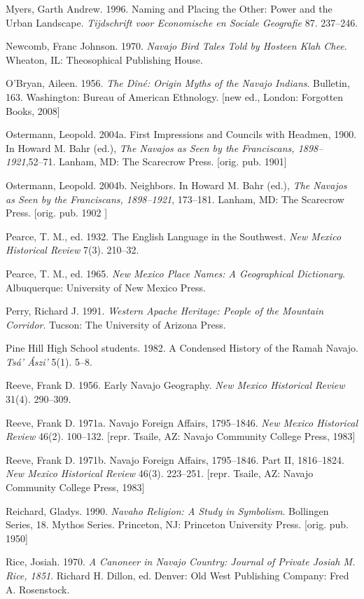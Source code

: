 Myers, Garth Andrew. 1996.  Naming and Placing the Other: Power and the Urban Landscape.  \textit{Tijdschrift voor Economische en Sociale Geografie} 87. 237--246.

Newcomb, Franc Johnson. 1970. \textit{Navajo Bird Tales Told by Hosteen Klah Chee}.  Wheaton, IL:  Theosophical Publishing House.

O'Bryan, Aileen. 1956. \textit{The Dîné: Origin Myths of the Navajo Indians}.  Bulletin,  163.  Washington:  Bureau of American Ethnology.  [new ed., London:  Forgotten Books, 2008]

Ostermann, Leopold. 2004a.  First Impressions and Councils with Headmen, 1900.  In Howard M. Bahr (ed.), \textit{The Navajos as Seen by the Franciscans, 1898--1921},52--71.  Lanham, MD:  The Scarecrow Press.  [orig. pub. 1901]


Ostermann, Leopold. 2004b.  Neighbors. In Howard M. Bahr (ed.), \textit{The Navajos as Seen by the Franciscans, 1898--1921}, 173--181.  Lanham, MD:  The Scarecrow Press.  [orig. pub. 1902 ]

Pearce, T. M., ed. 1932.  The English Language in the Southwest.  \textit{New Mexico Historical Review} 7(3). 210--32.

Pearce, T. M., ed. 1965. \textit{New Mexico Place Names: A Geographical Dictionary}.  Albuquerque:  University of New Mexico Press.

Perry, Richard J.  1991. \textit{Western Apache Heritage: People of the Mountain Corridor}.  Tucson:  The University of Arizona Press.

Pine Hill High School students. 1982.  A Condensed History of the Ramah Navajo.  \textit{Tsá’ Ászi’} 5(1). 5--8.

Reeve, Frank D.  1956.  Early Navajo Geography.  \textit{New Mexico Historical Review} 31(4). 290--309.

Reeve, Frank D. 1971a.  Navajo Foreign Affairs, 1795--1846.   \textit{New Mexico Historical Review} 46(2). 100--132.  [repr. Tsaile, AZ:  Navajo Community College Press, 1983]

Reeve, Frank D. 1971b.  Navajo Foreign Affairs, 1795--1846. Part II, 1816--1824.  \textit{New Mexico Historical Review} 46(3). 223--251.  [repr. Tsaile, AZ:  Navajo Community College Press, 1983]

Reichard, Gladys. 1990. \textit{Navaho Religion: A Study in Symbolism}.  Bollingen Series, 18.  Mythos Series.  Princeton, NJ:  Princeton University Press.  [orig. pub. 1950]

Rice, Josiah. 1970. \textit{A Canoneer in Navajo Country: Journal of Private Josiah M. Rice, 1851}.  Richard H. Dillon, ed.  Denver:  Old West Publishing Company: Fred A. Rosenstock.

